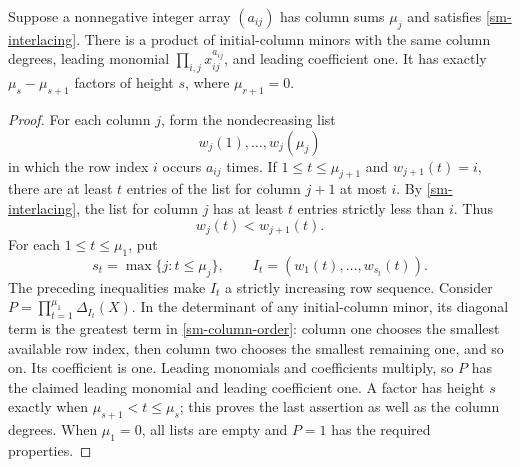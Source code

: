 \begin{lemma}\label{sm-matching-minors}
Suppose a nonnegative integer array $(a_{ij})$ has column sums
$\mu_j$ and satisfies \eqref{sm-interlacing}. There is a product of
initial-column minors with the same column degrees, leading monomial
$\prod_{i,j}x_{ij}^{a_{ij}}$, and leading coefficient one.
It has exactly $\mu_s-\mu_{s+1}$ factors of height $s$, where
$\mu_{r+1}=0$.
\end{lemma}
\begin{proof}
For each column $j$, form the nondecreasing list
\[
                       w_j(1),\ldots,w_j(\mu_j)
\]
in which the row index $i$ occurs $a_{ij}$ times. If
$1\le t\le\mu_{j+1}$ and $w_{j+1}(t)=i$, there are at least
$t$ entries of the list for column $j+1$ at most $i$.
By \eqref{sm-interlacing}, the list for column $j$ has at least
$t$ entries strictly less than $i$. Thus
\[
                         w_j(t)<w_{j+1}(t).
\]
For each $1\le t\le\mu_1$, put
\[
 s_t=\max\{j:t\le\mu_j\},\qquad
 I_t=(w_1(t),\ldots,w_{s_t}(t)).
\]
The preceding inequalities make $I_t$ a strictly increasing row
sequence. Consider $P=\prod_{t=1}^{\mu_1}\Delta_{I_t}(X)$.
In the determinant of any initial-column minor, its diagonal term
is the greatest term in \eqref{sm-column-order}: column one chooses
the smallest available row index, then column two chooses the
smallest remaining one, and so on. Its coefficient is one.
Leading monomials and coefficients multiply, so $P$ has the claimed
leading monomial and leading coefficient one. A factor has height
$s$ exactly when $\mu_{s+1}<t\le\mu_s$; this proves the last
assertion as well as the column degrees. When $\mu_1=0$, all lists
are empty and $P=1$ has the required properties.
\end{proof}

